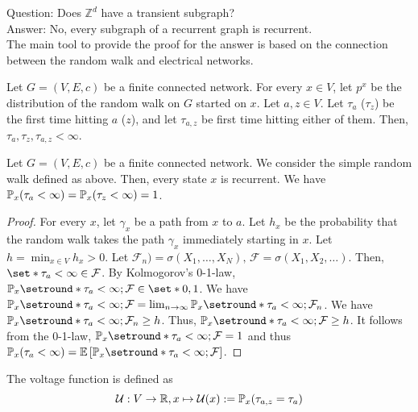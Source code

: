 \begin{remark}
    Question: Does \(\mathbb{Z}^d\) have a transient subgraph?\\
    Answer: No, every subgraph of a recurrent graph is recurrent. \\ 
    The main tool to provide the proof for the answer is based on the connection between the random walk and electrical networks.
\end{remark}


\begin{lem}
  Let $G=(V,E,c)$ be a finite connected network. For every $x\in V$, let \(p^x\) be the distribution of the random walk on $G$ started on $x$. Let $a,z \in V$. Let $\tau_a$ ($\tau_z$) be the first time hitting $a$ ($z$), and let $\tau_{a,z}$ be first time hitting either of them. Then, $\tau_a,\tau_z,\tau_{a,z}< \infty$.
\end{lem}


\begin{fact}
  Let $G=(V,E,c)$ be a finite connected network. We consider the simple random walk defined as above. Then, every state $x$ is recurrent. We have $\mathbb{P}_x(\tau_a < \infty)= \mathbb{P}_x(\tau_z<\infty)=1$.
\end{fact}
\begin{proof}
For every $x$, let $\gamma_x$ be a path from $x$ to $a$. Let $h_x$ be the probability that the random walk takes the path $\gamma_x$ immediately starting in $x$. Let $h= \min_{x\in V}h_x>0$. Let $\mathcal{F}_n ) = \sigma(X_1, \dots, X_N), \, \mathcal{F}=\sigma(X_1, X_2, \dots)$. Then, $\set*{\tau_a < \infty } \in \FFF$. By Kolmogorov's 0-1-law, $\mathbb{P}_x \setround*{\tau_a<\infty ; \FFF} \in \set*{0,1 }$. We have \(\mathbb{P}_x \setround*{\tau_a < \infty  ; \mathcal{F}} = \lim_{n \to \infty} \mathbb{P}_x \setround*{\tau_a < \infty ; \mathcal{F}_n}\). We have \(\mathbb{P}_x \setround*{\tau_a < \infty ;\mathcal{F}_n} \geq h \). Thus, \(\mathbb{P}_x \setround*{\tau_a <\infty  ;\mathcal{F}}\geq h\). It follows from the 0-1-law, $\mathbb{P}_x \setround*{ \tau_a < \infty ;\mathcal{F}}=1$ and thus \(\mathbb{P}_x(\tau_a < \infty) = \mathbb{E} \left[\mathbb{P}_x \setround*{\tau_a <\infty; \mathcal{F}}\right]\). 
\end{proof}



\begin{defn}
  The voltage function is defined as \[\mathcal{U}: V \to \mathbb{R}, x \mapsto \mathcal{U}(x):=\mathbb{P}_x(\tau_{a,z}=\tau_a)\]
\end{defn}



